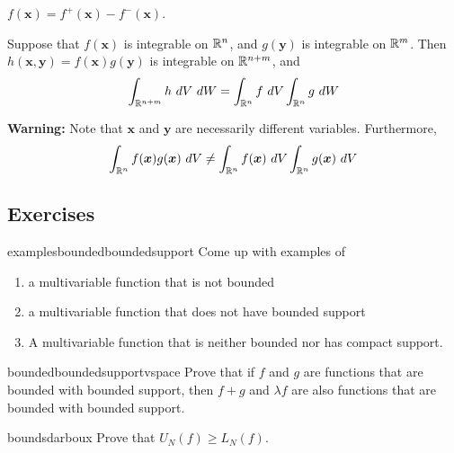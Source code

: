     \begin{proposition}
    $f(\bm{x}) = f^+(\bm{x}) - f^-(\bm{x})$.
    \end{proposition}


    \begin{proposition}
    Suppose that $f(\bm{x})$ is integrable on $\mathbb{R}^n$, and $g(\bm{y})$ is integrable on $\mathbb{R}^m$.  Then $h(\bm{x},\bm{y}) = f(\bm{x})g(\bm{y})$ is integrable on $\mathbb{R}^{n+m}$, and 
    $$\int_{\mathbb{R}^{n+m}} h \ dV \ dW = \int_{\mathbb{R}^n} f \ dV \int_{\mathbb{R}^n} g \ dW$$
    \end{proposition}
    
    \begin{remark}
        \textbf{Warning:} Note that $\bm{x}$ and $\bm{y}$ are necessarily different variables.  Furthermore, $$\int_{\mathbb{R}^{n}} f(\bm{x})g(\bm{x}) \ dV \neq \int_{\mathbb{R}^n} f(\bm{x}) \ dV \int_{\mathbb{R}^n} g(\bm{x}) \ dV$$
    \end{remark}

    \begin{example}
    \end{example}
    
\subsection{Exercises}

\begin{problem}{examplesboundedboundedsupport}
Come up with examples of
       \begin{enumerate}
           \item a multivariable function that is not bounded
           \item a multivariable function that does not have bounded support
           \item A multivariable function that is neither bounded nor has compact support.
       \end{enumerate}
\end{problem}

\begin{problem}{boundedboundedsupportvspace}
    Prove that if $f$ and $g$ are functions that are bounded with bounded support, then $f+g$ and $\lambda f$ are also functions that are bounded with bounded support.
\end{problem}

\begin{problem}{boundsdarboux}
    Prove that $U_N(f) \geq L_N(f)$.
\end{problem}

